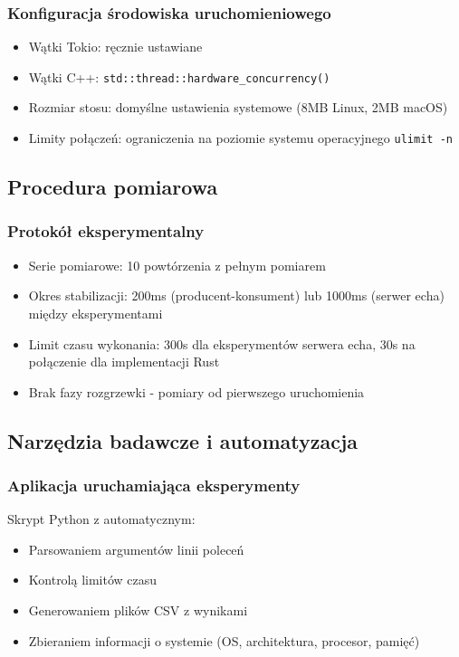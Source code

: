 \subsubsection{Konfiguracja środowiska uruchomieniowego}
\begin{itemize}
    \item Wątki Tokio: ręcznie ustawiane
    \item Wątki C++: \texttt{std::thread::hardware\_concurrency()}
    \item Rozmiar stosu: domyślne ustawienia systemowe (8MB Linux, 2MB macOS)
    \item Limity połączeń: ograniczenia na poziomie systemu operacyjnego \texttt{ulimit -n}
\end{itemize}

\subsection{Procedura pomiarowa}

\subsubsection{Protokół eksperymentalny}
\begin{itemize}
    \item Serie pomiarowe: 10 powtórzenia z pełnym pomiarem
    \item Okres stabilizacji: 200ms (producent-konsument) lub 1000ms (serwer echa) między eksperymentami
    \item Limit czasu wykonania: 300s dla eksperymentów serwera echa, 30s na połączenie dla implementacji Rust
    \item Brak fazy rozgrzewki  - pomiary od pierwszego uruchomienia
\end{itemize}

\subsection{Narzędzia badawcze i automatyzacja}

\subsubsection{Aplikacja uruchamiająca eksperymenty}
Skrypt Python z automatycznym:
\begin{itemize}
    \item Parsowaniem argumentów linii poleceń
    \item Kontrolą limitów czasu
    \item Generowaniem plików CSV z wynikami
    \item Zbieraniem informacji o systemie (OS, architektura, procesor, pamięć)
\end{itemize}

